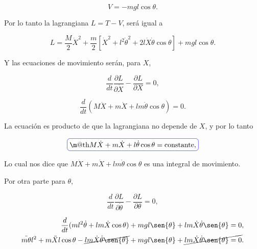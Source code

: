 \documentclass[a4paper,10pt]{article}
\makeatletter
\numberwithin{equation}{section}
\newcommand*{\boxcolor}{blue}
\renewcommand{\boxed}[1]{\textcolor{\boxcolor}{%
\tikz[baseline={([yshift=-1ex]current bounding box.center)}] \node [rectangle, minimum width=1ex,rounded corners,draw] {\normalcolor\m@th$\displaystyle#1$};}}
\makeatother
\begin{document}
\begin{equation}
 V = -mgl \cos{\theta}.
\end{equation}

Por lo tanto la lagrangiana $L = T - V$, será igual a 

\begin{equation}
 L = \frac{M}{2}\dot{X}^2 + \frac{m}{2}[\dot{X}^2 + l^2 \dot{\theta}^2 + 
    2l\dot{X}\dot{\theta}\cos{\theta}] + mgl \cos{\theta}.
\end{equation}

Y las ecuaciones de movimiento serán, para $X$,

\begin{equation}
 \frac{d}{dt}\frac{\partial L}{\partial \dot{X}} - \frac{\partial L}{\partial X} = 0,
\end{equation}

\begin{equation}
 \frac{d}{dt} (M \dot{X} + m \dot{X} + lm\dot{\theta}\cos{\theta}) = 0.
 \label{eq:pendu7}
\end{equation}

La ecuación  es producto de que la lagrangiana no depende de $X$, y por 
lo tanto

\begin{equation}
 \boxed{M \dot{X} + m \dot{X} + l\dot{\theta}\cos{\theta} = \text{constante},}
\end{equation}

Lo cual nos dice que $M \dot{X} + m \dot{X} + lm\dot{\theta}\cos{\theta}$ es una integral 
de movimiento.

\vspace{.3cm}

Por otra parte para $\theta$,

\begin{equation}
  \frac{d}{dt}\frac{\partial L}{\partial \dot{\theta}} - \frac{\partial L}{\partial \theta} = 0,
\end{equation}

\begin{align}
\begin{split}
 \frac{d}{dt}(ml^2 \dot{\theta} + lm \dot{X} \cos{\theta}) + mgl\sen{\theta} +
 lm \dot{X} \dot{\theta} \sen{\theta} = 0, \\
 \ddot{m\theta}l^2  + m\ddot{X}l\cos{\theta} - \cancel{lm\dot{X}\dot{\theta}\sen{\theta}} + mgl\sen{\theta} +
 \cancel{lm \dot{X} \dot{\theta} \sen{\theta} = 0}. \\
 \end{split}
\end{align}
\end{document}
